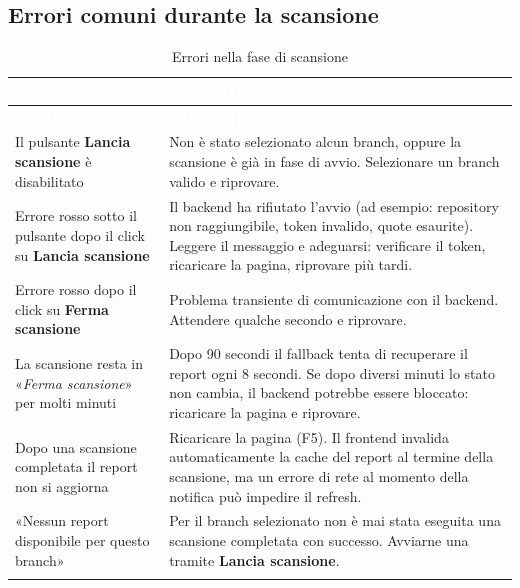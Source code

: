 \documentclass[a4paper, 11pt]{article}
\begin{document}
\subsection{Errori comuni durante la scansione}

\begin{longtable}{>{\raggedright\arraybackslash}p{5cm} >{\raggedright\arraybackslash}p{9cm}}
  \rowcolor{AccentColor}
  \textcolor{white}{\textbf{Situazione}} &
  \textcolor{white}{\textbf{Causa e risoluzione}} \\
  \endfirsthead

  \rowcolor{AccentColor}
  \textcolor{white}{\textbf{Situazione}} &
  \textcolor{white}{\textbf{Causa e risoluzione}} \\
  \endhead

  Il pulsante \textbf{Lancia scansione} è disabilitato &
  Non è stato selezionato alcun branch, oppure la scansione è già in fase di avvio. Selezionare un branch valido e riprovare. \\
  Errore rosso sotto il pulsante dopo il click su \textbf{Lancia scansione} &
  Il backend ha rifiutato l'avvio (ad esempio: repository non raggiungibile, token invalido, quote esaurite). Leggere il messaggio e adeguarsi: verificare il token, ricaricare la pagina, riprovare più tardi. \\
  Errore rosso dopo il click su \textbf{Ferma scansione} &
  Problema transiente di comunicazione con il backend. Attendere qualche secondo e riprovare. \\
  La scansione resta in «\textit{Ferma scansione}» per molti minuti &
  Dopo 90 secondi il fallback tenta di recuperare il report ogni 8 secondi. Se dopo diversi minuti lo stato non cambia, il backend potrebbe essere bloccato: ricaricare la pagina e riprovare. \\
  Dopo una scansione completata il report non si aggiorna &
  Ricaricare la pagina (F5). Il frontend invalida automaticamente la cache del report al termine della scansione, ma un errore di rete al momento della notifica può impedire il refresh. \\
  «Nessun report disponibile per questo branch» &
  Per il branch selezionato non è mai stata eseguita una scansione completata con successo. Avviarne una tramite \textbf{Lancia scansione}. \\
\caption{Errori nella fase di scansione}
\label{tab:errori-scan}
\end{longtable}

\newpage
\end{document}
